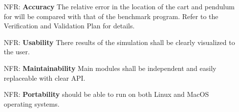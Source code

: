 \documentclass[12pt]{article}
\newcounter{nfrnum} %
\begin{document}
\noindent \begin{itemize}

\item[NFR\refstepcounter{nfrnum}\thenfrnum \label{NFR_Accuracy}:] 
\textbf{Accuracy} The relative error in the location of the cart and pendulum 
for \progname{} will be compared with that of the benchmark program. 
Refer to the Verification and Validation Plan for details.

\item[NFR\refstepcounter{nfrnum}\thenfrnum \label{NFR_Usability}:] \textbf{Usability}
  There results of the simulation shall be clearly visualized to the user.

\item[NFR\refstepcounter{nfrnum}\thenfrnum \label{NFR_Maintainability}:]
  \textbf{Maintainability}
  Main modules shall be independent and easily replaceable with clear API.

\item[NFR\refstepcounter{nfrnum}\thenfrnum \label{NFR_Portability}:]
  \textbf{Portability}
  \progname{} should be able to run on both Linux and MacOS operating systems.


\end{itemize}
\end{document}
